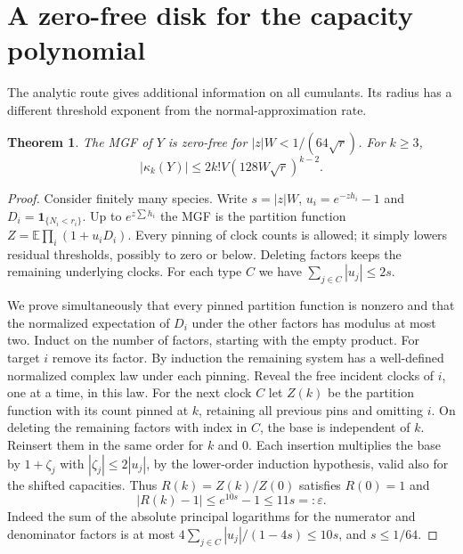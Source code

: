 \documentclass[11pt]{article}
\newtheorem{theorem}{Theorem}[section]
\newcommand{\E}{\mathbb E}
\newcommand{\ind}{\mathbf1}
\newcommand{\kk}{\kappa}
\numberwithin{equation}{section}
\begin{document}
\section{A zero-free disk for the capacity polynomial}\label{sec:complex}
The analytic route gives additional information on all cumulants. Its radius
has a different threshold exponent from the normal-approximation rate.
\begin{theorem}\label{thm:disk}
The MGF of $Y$ is zero-free for $|z|W<1/(64\sqrt r)$. For $k\ge3$,
\[
 |\kk_k(Y)|\le 2k!V(128W\sqrt r)^{k-2}.
\]
\end{theorem}
\begin{proof}
Consider finitely many species. Write $s=|z|W$, $u_i=e^{-zh_i}-1$ and
$D_i=\ind_{\{N_i<r_i\}}$. Up to $e^{z\sum h_i}$ the MGF is the partition function
$Z=\E\prod_i(1+u_iD_i)$. Every pinning of clock counts is allowed; it simply
lowers residual thresholds, possibly to zero or below. Deleting factors
keeps the remaining underlying clocks. For each type $C$ we have
$\sum_{j\in C}|u_j|\le2s$.

We prove simultaneously that every pinned partition function is nonzero and that
the normalized expectation of $D_i$ under the other factors has modulus at most
two. Induct on the number of factors, starting with the empty product.
For target $i$ remove its factor. By induction the remaining system has a
well-defined normalized complex law under each pinning. Reveal the free
incident clocks of $i$, one at a time, in this law.
For the next clock $C$ let $Z(k)$ be the partition function with its count
pinned at $k$, retaining all previous pins and omitting $i$. On deleting the
remaining factors with index in $C$, the base is independent of $k$.
Reinsert them in the same order for $k$ and $0$. Each insertion multiplies
the base by $1+\zeta_j$ with $|\zeta_j|\le 2|u_j|$, by the lower-order
induction hypothesis, valid also for the shifted capacities. Thus $R(k)=Z(k)/Z(0)$
satisfies $R(0)=1$ and
\[
 |R(k)-1|\le e^{10s}-1\le11s=:\varepsilon .
\]
Indeed the sum of the absolute principal logarithms for the numerator and
denominator factors is at most $4\sum_{j\in C}|u_j|/(1-4s)\le10s$,
and $s\le1/64$.


\end{proof}
\end{document}

